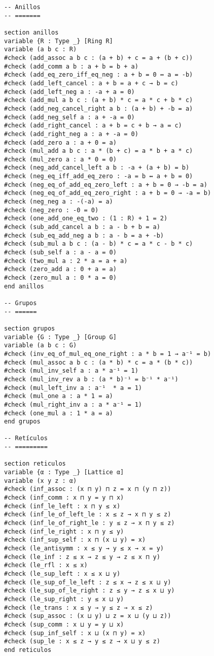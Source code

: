 \begin{verbatim}
-- Anillos
-- =======

section anillos
variable {R : Type _} [Ring R]
variable (a b c : R)
#check (add_assoc a b c : (a + b) + c = a + (b + c))
#check (add_comm a b : a + b = b + a)
#check (add_eq_zero_iff_eq_neg : a + b = 0 ↔ a = -b)
#check (add_left_cancel : a + b = a + c → b = c)
#check (add_left_neg a : -a + a = 0)
#check (add_mul a b c : (a + b) * c = a * c + b * c)
#check (add_neg_cancel_right a b : (a + b) + -b = a)
#check (add_neg_self a : a + -a = 0)
#check (add_right_cancel : a + b = c + b → a = c)
#check (add_right_neg a : a + -a = 0)
#check (add_zero a : a + 0 = a)
#check (mul_add a b c : a * (b + c) = a * b + a * c)
#check (mul_zero a : a * 0 = 0)
#check (neg_add_cancel_left a b : -a + (a + b) = b)
#check (neg_eq_iff_add_eq_zero : -a = b ↔ a + b = 0)
#check (neg_eq_of_add_eq_zero_left : a + b = 0 → -b = a)
#check (neg_eq_of_add_eq_zero_right : a + b = 0 → -a = b)
#check (neg_neg a : -(-a) = a)
#check (neg_zero : -0 = 0)
#check (one_add_one_eq_two : (1 : R) + 1 = 2)
#check (sub_add_cancel a b : a - b + b = a)
#check (sub_eq_add_neg a b : a - b = a + -b)
#check (sub_mul a b c : (a - b) * c = a * c - b * c)
#check (sub_self a : a - a = 0)
#check (two_mul a : 2 * a = a + a)
#check (zero_add a : 0 + a = a)
#check (zero_mul a : 0 * a = 0)
end anillos

-- Grupos
-- ======

section grupos
variable {G : Type _} [Group G]
variable (a b c : G)
#check (inv_eq_of_mul_eq_one_right : a * b = 1 → a⁻¹ = b)
#check (mul_assoc a b c : (a * b) * c = a * (b * c))
#check (mul_inv_self a : a * a⁻¹ = 1)
#check (mul_inv_rev a b : (a * b)⁻¹ = b⁻¹ * a⁻¹)
#check (mul_left_inv a : a⁻¹  * a = 1)
#check (mul_one a : a * 1 = a)
#check (mul_right_inv a : a * a⁻¹ = 1)
#check (one_mul a : 1 * a = a)
end grupos

-- Retículos
-- =========

section reticulos
variable {α : Type _} [Lattice α]
variable (x y z : α)
#check (inf_assoc : (x ⊓ y) ⊓ z = x ⊓ (y ⊓ z))
#check (inf_comm : x ⊓ y = y ⊓ x)
#check (inf_le_left : x ⊓ y ≤ x)
#check (inf_le_of_left_le : x ≤ z → x ⊓ y ≤ z)
#check (inf_le_of_right_le : y ≤ z → x ⊓ y ≤ z)
#check (inf_le_right : x ⊓ y ≤ y)
#check (inf_sup_self : x ⊓ (x ⊔ y) = x)
#check (le_antisymm : x ≤ y → y ≤ x → x = y)
#check (le_inf : z ≤ x → z ≤ y → z ≤ x ⊓ y)
#check (le_rfl : x ≤ x)
#check (le_sup_left : x ≤ x ⊔ y)
#check (le_sup_of_le_left : z ≤ x → z ≤ x ⊔ y)
#check (le_sup_of_le_right : z ≤ y → z ≤ x ⊔ y)
#check (le_sup_right : y ≤ x ⊔ y)
#check (le_trans : x ≤ y → y ≤ z → x ≤ z)
#check (sup_assoc : (x ⊔ y) ⊔ z = x ⊔ (y ⊔ z))
#check (sup_comm : x ⊔ y = y ⊔ x)
#check (sup_inf_self : x ⊔ (x ⊓ y) = x)
#check (sup_le : x ≤ z → y ≤ z → x ⊔ y ≤ z)
end reticulos


\end{verbatim}

